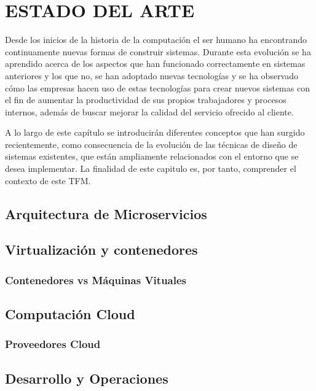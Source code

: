 \documentclass[spanish,twoside,12pt,a4paper]{book}
\begin{document}
\chapter{ESTADO DEL ARTE}

Desde los inicios de la historia de la computación el ser humano ha encontrando continuamente nuevas formas de construir sistemas. Durante esta evolución se ha aprendido acerca de los aspectos que han funcionado correctamente en sistemas anteriores y los que no, se han adoptado nuevas tecnologías y se ha observado cómo las empresas hacen uso de estas tecnologías para crear nuevos sistemas con el fin de aumentar la productividad de sus propios trabajadores y procesos internos, además de buscar mejorar la calidad del servicio ofrecido al cliente.

A lo largo de este capítulo se introducirán diferentes conceptos que han surgido recientemente, como consecuencia de la evolución de las técnicas de diseño de sistemas existentes, que están ampliamente relacionados con el entorno que se desea implementar. La finalidad de este capitulo es, por tanto, comprender el contexto de este TFM. 

\section{Arquitectura de Microservicios}




\section{Virtualización y contenedores}

\subsection{Contenedores vs Máquinas Vituales}

\section{Computación Cloud}
\subsection{Proveedores Cloud}

\section{Desarrollo y Operaciones}
\end{document}
